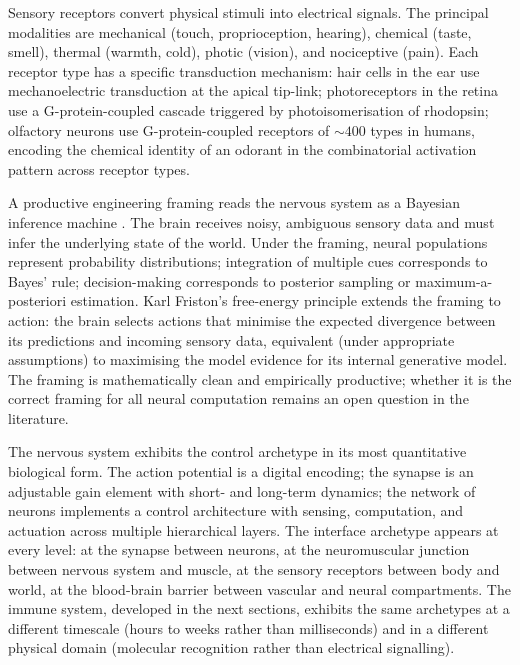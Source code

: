  Sensory receptors convert physical
stimuli into electrical signals. The principal modalities are
mechanical (touch, proprioception, hearing), chemical (taste, smell),
thermal (warmth, cold), photic (vision), and nociceptive (pain). Each
receptor type has a specific transduction mechanism: hair cells in
the ear use mechanoelectric transduction at the apical tip-link;
photoreceptors in the retina use a G-protein-coupled cascade triggered
by photoisomerisation of rhodopsin; olfactory neurons use
G-protein-coupled receptors of $\sim 400$ types in humans, encoding
the chemical identity of an odorant in the combinatorial activation
pattern across receptor types.

 A productive engineering
framing reads the nervous system as a Bayesian inference machine
\cite{paper:v6c07-knill-pouget-2004}. The brain receives noisy,
ambiguous sensory data and must infer the underlying state of the
world. Under the framing, neural populations represent probability
distributions; integration of multiple cues corresponds to Bayes'
rule; decision-making corresponds to posterior sampling or maximum-a-
posteriori estimation. Karl Friston's free-energy principle
\cite{paper:v6c07-friston-2010} extends the framing to action: the
brain selects actions that minimise the expected divergence between
its predictions and incoming sensory data, equivalent (under
appropriate assumptions) to maximising the model evidence for its
internal generative model. The framing is mathematically clean and
empirically productive; whether it is the correct framing for all
neural computation remains an open question in the literature.

\begin{archetype}
The nervous system exhibits the control archetype in its most
quantitative biological form. The action potential is a digital
encoding; the synapse is an adjustable gain element with short- and
long-term dynamics; the network of neurons implements a control
architecture with sensing, computation, and actuation across multiple
hierarchical layers. The interface archetype appears at every level:
at the synapse between neurons, at the neuromuscular junction between
nervous system and muscle, at the sensory receptors between body and
world, at the blood-brain barrier between vascular and neural
compartments. The immune system, developed in the next sections,
exhibits the same archetypes at a different timescale (hours to weeks
rather than milliseconds) and in a different physical domain
(molecular recognition rather than electrical signalling).
\end{archetype}

